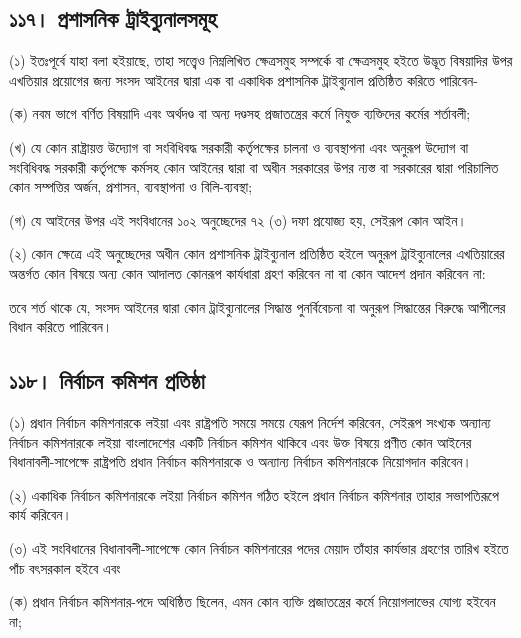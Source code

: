 \documentclass[11pt]{article}
\begin{document}
\subsection{১১৭। প্রশাসনিক ট্রাইব্যুনালসমূহ}
\label{sec:orga920569}
(১) ইতঃপূর্বে যাহা বলা হইয়াছে, তাহা সত্ত্বেও নিম্নলিখিত ক্ষেত্রসমুহ সম্পর্কে বা
    ক্ষেত্রসমুহ হইতে উদ্ভূত বিষয়াদির উপর এখতিয়ার প্রয়োগের জন্য সংসদ আইনের দ্বারা
    এক বা একাধিক প্রশাসনিক ট্রাইব্যুনাল প্রতিষ্ঠিত করিতে পারিবেন-

(ক) নবম ভাগে বর্ণিত বিষয়াদি এবং অর্থদণ্ড বা অন্য দণ্ডসহ প্রজাতন্ত্রের কর্মে
    নিযুক্ত ব্যক্তিদের কর্মের শর্তাবলী;

(খ) যে কোন রাষ্ট্রায়ত্ত উদ্যোগ বা সংবিধিবদ্ধ সরকারী কর্তৃপক্ষের চালনা ও
    ব্যবস্থাপনা এবং অনুরূপ উদ্যোগ বা সংবিধিবদ্ধ সরকারী কর্তৃপক্ষে কর্মসহ কোন আইনের
    দ্বারা বা অধীন সরকারের উপর ন্যস্ত বা সরকারের দ্বারা পরিচালিত কোন সম্পত্তির
    অর্জন, প্রশাসন, ব্যবস্থাপনা ও বিলি-ব্যবস্থা;

(গ) যে আইনের উপর এই সংবিধানের ১০২ অনুচ্ছেদের ৭২ (৩) দফা প্রযোজ্য হয়, সেইরূপ
    কোন আইন।

(২) কোন ক্ষেত্রে এই অনুচ্ছেদের অধীন কোন প্রশাসনিক ট্রাইব্যুনাল প্রতিষ্ঠিত হইলে
    অনুরূপ ট্রাইব্যুনালের এখতিয়ারের অন্তর্গত কোন বিষয়ে অন্য কোন আদালত কোনরূপ
    কার্যধারা গ্রহণ করিবেন না বা কোন আদেশ প্রদান করিবেন না:

তবে শর্ত থাকে যে, সংসদ আইনের দ্বারা কোন ট্রাইব্যুনালের সিদ্ধান্ত পুনর্বিবেচনা
বা অনুরূপ সিদ্ধান্তের বিরুদ্ধে আপীলের বিধান করিতে পারিবেন।

\subsection{১১৮। নির্বাচন কমিশন প্রতিষ্ঠা}
\label{sec:org5253303}
(১) প্রধান নির্বাচন কমিশনারকে লইয়া এবং রাষ্ট্রপতি সময়ে সময়ে যেরূপ নির্দেশ
    করিবেন, সেইরূপ সংখ্যক অন্যান্য নির্বাচন কমিশনারকে লইয়া বাংলাদেশের একটি
    নির্বাচন কমিশন থাকিবে এবং উক্ত বিষয়ে প্রণীত কোন আইনের বিধানাবলী-সাপেক্ষে
    রাষ্ট্রপতি প্রধান নির্বাচন কমিশনারকে ও অন্যান্য নির্বাচন কমিশনারকে নিয়োগদান
    করিবেন।

(২) একাধিক নির্বাচন কমিশনারকে লইয়া নির্বাচন কমিশন গঠিত হইলে প্রধান
    নির্বাচন কমিশনার তাহার সভাপতিরূপে কার্য করিবেন।

(৩) এই সংবিধানের বিধানাবলী-সাপেক্ষে কোন নির্বাচন কমিশনারের পদের মেয়াদ
    তাঁহার কার্যভার গ্রহণের তারিখ হইতে পাঁচ বৎসরকাল হইবে এবং

(ক) প্রধান নির্বাচন কমিশনার-পদে অধিষ্ঠিত ছিলেন, এমন কোন ব্যক্তি প্রজাতন্ত্রের
    কর্মে নিয়োগলাভের যোগ্য হইবেন না;
\end{document}
